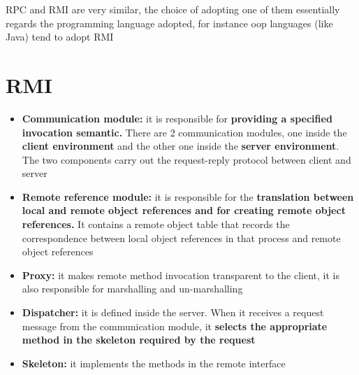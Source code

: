 RPC and RMI are very similar, the choice of adopting one of them essentially regards the programming language adopted, for instance oop languages (like Java) tend to adopt RMI

\section{RMI}
\begin{itemize}
    \item \textbf{Communication module:} it is responsible for \textbf{providing a specified invocation semantic.} There are 2 communication modules, one inside the \textbf{client environment} and the other one inside the \textbf{server environment}. The two components carry out the request-reply protocol between client and server
    \item \textbf{Remote reference module:} it is responsible for the \textbf{translation between local and remote object references and for creating remote object references.} It contains a remote object table that records the correspondence between local object references in that process and remote object references
    \item \textbf{Proxy:} it makes remote method invocation transparent to the client, it is also responsible for marshalling and un-marshalling
    \item \textbf{Dispatcher:} it is defined inside the server. When it receives a request message from the communication module, it \textbf{selects the appropriate method in the skeleton required by the request}
    \item \textbf{Skeleton:} it implements the methods in the remote interface
    

\end{itemize}

